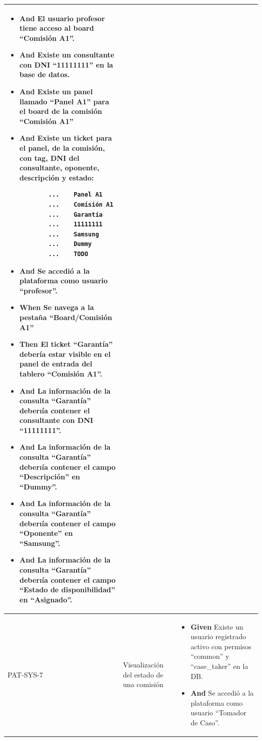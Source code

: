 \begin{longtable}{|p{1cm}|p{2.5cm}|p{12cm}|}
\begin{itemize}
        \item \textbf{And} El usuario profesor tiene acceso al board ``Comisión A1''.
        \item \textbf{And} Existe un consultante con DNI ``11111111'' en la base de datos.
        \item \textbf{And} Existe un panel llamado ``Panel A1'' para el board de la comisión ``Comisión A1''
        \item \textbf{And} Existe un ticket para el panel, de la comisión, con tag, DNI del consultante, oponente, descripción y estado:
        \begin{verbatim}
        ...    Panel A1
        ...    Comisión A1
        ...    Garantía
        ...    11111111
        ...    Samsung
        ...    Dummy
        ...    TODO
        \end{verbatim}
        \item \textbf{And} Se accedió a la plataforma como usuario ``profesor''.
        \newline
        \item \textbf{When} Se navega a la pestaña ``Board/Comisión A1''
        \newline
        \item \textbf{Then} El ticket ``Garant\'ia'' deber\'ia estar visible en el panel de entrada del tablero ``Comisión A1''.
        \item \textbf{And} La información de la consulta ``Garant\'ia'' deberı\'ia contener el consultante con DNI ``11111111''.
        \item \textbf{And} La información de la consulta ``Garant\'ia'' deberı\'ia contener el campo ``Descripción'' en ``Dummy''.
        \item \textbf{And} La información de la consulta ``Garant\'ia'' deberı\'ia contener el campo ``Oponente'' en ``Samsung''.
        \item \textbf{And} La información de la consulta ``Garant\'ia'' deberı\'ia contener el campo ``Estado de disponibilidad'' en ``Asignado''.
    \end{itemize}
    \\ 
    \hline
    PAT-SYS-7 & Visualización del estado de una comisión & 
    \begin{itemize}
        \item \textbf{Given} Existe un usuario registrado activo con permisos ``common'' y ``case\_taker'' en la DB.
        \item \textbf{And} Se accedió a la plataforma como usuario ``Tomador de Caso''.

\end{itemize}
\end{longtable}
